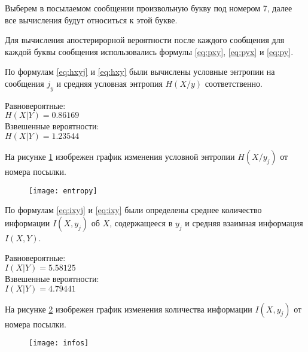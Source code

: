 Выберем в посылаемом сообщении произвольную букву под номером 7, далее все вычисления будут относиться к этой букве.

Для вычисления апостерирорной вероятности после каждого сообщения для каждой буквы сообщения использовались формулы \ref{eq:pxy}, \ref{eq:pyx} и \ref{eq:py}.

По формулам \ref{eq:hxyj} и \ref{eq:hxy} были вычислены условные энтропии на сообщения $j_y$ и средняя условная энтропия $H(X/y)$ соответственно. 

\begin{multicols}{2}
\begin{center}
Равновероятные:\\
$H(X|Y) = 0.86169$\\
Взвешенные вероятности:\\
$H(X|Y) = 1.23544$
\end{center}
\end{multicols}

На рисунке \ref{plt:entropy} изобрежен график изменения условной энтропии $H(X/y_j)$ от номера посылки.

\begin{figure}[H]
\begin{center}
	\vspace{-0.5cm}
	\texttt{[image: entropy]}
	\caption{}
	\label{plt:entropy}
	\vspace{-0.5cm}
\end{center}
\end{figure}

По формулам \ref{eq:ixyj} и \ref{eq:ixy} были определены среднее количество информации $I(X, y_j)$ об $X$, содержащееся в $y_j$ и средняя взаимная информация $I(X, Y)$.

\begin{multicols}{2}
\begin{center}
Равновероятные:\\
$I(X|Y) = 5.58125$\\
Взвешенные вероятности:\\
$I(X|Y) = 4.79441$
\end{center}
\end{multicols}

На рисунке \ref{plt:info} изобрежен график изменения количества
информации $I(X, y_j)$ от номера посылки.

\begin{figure}[H]
\begin{center}
	\vspace{-0.5cm}
	\texttt{[image: infos]}
	\caption{}
	\label{plt:info}
	\vspace{-0.5cm}
\end{center}
\end{figure}

